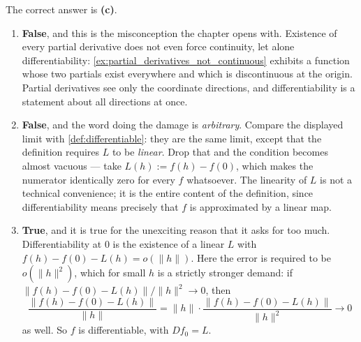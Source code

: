 \begin{exercisesolution}
\label{sol:kobel_differentiable_single_choice}
The correct answer is \textbf{(c)}.
\begin{enumerate}[label=\textbf{(\alph*)}]
  \item \textbf{False}, and this is the misconception the chapter opens with. Existence of every
    partial derivative does not even force continuity, let alone differentiability:
    \cref{ex:partial_derivatives_not_continuous} exhibits a function whose two partials exist
    everywhere and which is discontinuous at the origin. Partial derivatives see only the
    coordinate directions, and differentiability is a statement about all directions at once.
  \item \textbf{False}, and the word doing the damage is \emph{arbitrary}. Compare the displayed
    limit with \cref{def:differentiable}: they are the same limit, except that the definition
    requires $L$ to be \emph{linear}. Drop that and the condition becomes almost vacuous --- take
    $L(h) := f(h)-f(0)$, which makes the numerator identically zero for every $f$ whatsoever. The
    linearity of $L$ is not a technical convenience; it is the entire content of the definition,
    since differentiability means precisely that $f$ is approximated by a linear map.
  \item \textbf{True}, and it is true for the unexciting reason that it asks for too much.
    Differentiability at $0$ is the existence of a linear $L$ with
    $f(h)-f(0)-L(h) = o(\lVert h\rVert)$. Here the error is required to be
    $o(\lVert h\rVert^2)$, which for small $h$ is a strictly stronger demand: if
    $\lVert f(h)-f(0)-L(h)\rVert/\lVert h\rVert^2 \to 0$, then
    \[\frac{\lVert f(h)-f(0)-L(h)\rVert}{\lVert h\rVert}
      = \lVert h\rVert \cdot \frac{\lVert f(h)-f(0)-L(h)\rVert}{\lVert h\rVert^2} \to 0\]
    as well. So $f$ is differentiable, with $Df_0 = L$.

\end{enumerate}
\end{exercisesolution}
